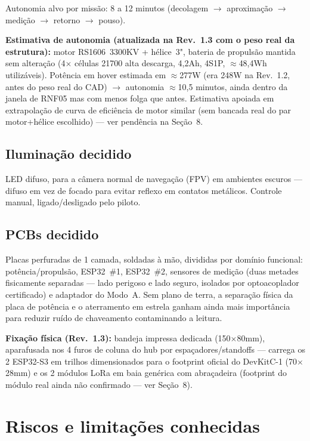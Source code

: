 \documentclass[11pt,a4paper]{article}
\newcommand{\statusok}{\textcolor{voltok}{\textbf{decidido}}}
\newcommand{\destaque}[2]{%
  \par\noindent\colorbox{voltbandbg}{%
    \begin{minipage}{\dimexpr\linewidth-2\fboxsep\relax}
      \vspace{0.3em}
      \textcolor{voltcyan}{\textbf{#1}} #2
      \vspace{0.3em}
    \end{minipage}%
  }\par\vspace{1em}
}
\begin{document}
Autonomia alvo por missão: 8 a 12 minutos (decolagem $\rightarrow$ aproximação $\rightarrow$ medição $\rightarrow$ retorno $\rightarrow$ pouso).

\destaque{Estimativa de autonomia (atualizada na Rev.~1.3 com o peso real da estrutura):}{motor RS1606~3300KV + hélice~3", bateria de propulsão mantida sem alteração (4$\times$ células 21700 alta descarga, 4,2Ah, 4S1P, $\approx$48,4Wh utilizáveis). Potência em hover estimada em $\approx$277W (era 248W na Rev.~1.2, antes do peso real do CAD) $\rightarrow$ autonomia $\approx$10,5 minutos, ainda dentro da janela de RNF05 mas com menos folga que antes. Estimativa apoiada em extrapolação de curva de eficiência de motor similar (sem bancada real do par motor+hélice escolhido) — ver pendência na Seção~8.}

\subsection{Iluminação \normalfont\statusok}

LED difuso, para a câmera normal de navegação (FPV) em ambientes escuros — difuso em vez de focado para evitar reflexo em contatos metálicos. Controle manual, ligado/desligado pelo piloto.

\subsection{PCBs \normalfont\statusok}

Placas perfuradas de 1 camada, soldadas à mão, divididas por domínio funcional: potência/propulsão, ESP32~\#1, ESP32~\#2, sensores de medição (duas metades fisicamente separadas — lado perigoso e lado seguro, isolados por optoacoplador certificado) e adaptador do Modo~A. Sem plano de terra, a separação física da placa de potência e o aterramento em estrela ganham ainda mais importância para reduzir ruído de chaveamento contaminando a leitura.

\textbf{Fixação física (Rev.~1.3):} bandeja impressa dedicada (150$\times$80mm), aparafusada nos 4 furos de coluna do hub por espaçadores/standoffs — carrega os 2 ESP32-S3 em trilhos dimensionados para o footprint oficial do DevKitC-1 (70$\times$28mm) e os 2 módulos LoRa em baia genérica com abraçadeira (footprint do módulo real ainda não confirmado — ver Seção~8).

\section{Riscos e limitações conhecidas}
\end{document}
